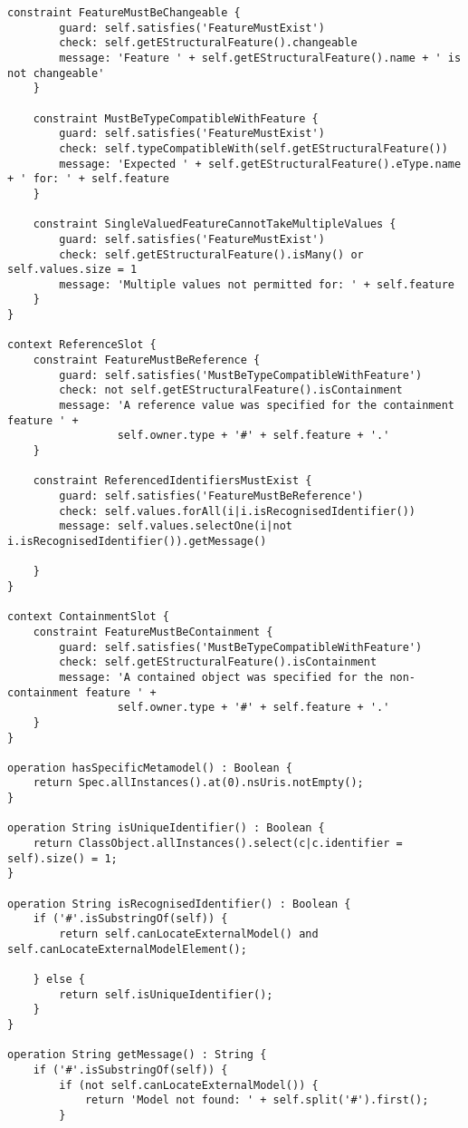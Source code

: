 \begin{lstlisting}[caption=Syntactic and Conformance Constraints in EVL., label=lst:constraints_full, language=EVL]
	constraint FeatureMustBeChangeable {
		guard: self.satisfies('FeatureMustExist')
		check: self.getEStructuralFeature().changeable
		message: 'Feature ' + self.getEStructuralFeature().name + ' is not changeable'
	}
	
	constraint MustBeTypeCompatibleWithFeature {
		guard: self.satisfies('FeatureMustExist')
		check: self.typeCompatibleWith(self.getEStructuralFeature())
		message: 'Expected ' + self.getEStructuralFeature().eType.name + ' for: ' + self.feature
	}
	
	constraint SingleValuedFeatureCannotTakeMultipleValues {
		guard: self.satisfies('FeatureMustExist')
		check: self.getEStructuralFeature().isMany() or self.values.size = 1
		message: 'Multiple values not permitted for: ' + self.feature
	}
}

context ReferenceSlot {
	constraint FeatureMustBeReference {
		guard: self.satisfies('MustBeTypeCompatibleWithFeature')
		check: not self.getEStructuralFeature().isContainment
		message: 'A reference value was specified for the containment feature ' +
		         self.owner.type + '#' + self.feature + '.'
	}

	constraint ReferencedIdentifiersMustExist {
		guard: self.satisfies('FeatureMustBeReference')
		check: self.values.forAll(i|i.isRecognisedIdentifier())
		message: self.values.selectOne(i|not i.isRecognisedIdentifier()).getMessage()
				 
	}
}

context ContainmentSlot {
	constraint FeatureMustBeContainment {
		guard: self.satisfies('MustBeTypeCompatibleWithFeature')
		check: self.getEStructuralFeature().isContainment
		message: 'A contained object was specified for the non-containment feature ' +
		         self.owner.type + '#' + self.feature + '.'
	}
}

operation hasSpecificMetamodel() : Boolean {
	return Spec.allInstances().at(0).nsUris.notEmpty();
}

operation String isUniqueIdentifier() : Boolean {
	return ClassObject.allInstances().select(c|c.identifier = self).size() = 1;
}

operation String isRecognisedIdentifier() : Boolean {
	if ('#'.isSubstringOf(self)) {	
		return self.canLocateExternalModel() and self.canLocateExternalModelElement();

	} else {
		return self.isUniqueIdentifier();
	}
}

operation String getMessage() : String {
	if ('#'.isSubstringOf(self)) {
		if (not self.canLocateExternalModel()) {
			return 'Model not found: ' + self.split('#').first();
		}
		

\end{lstlisting}
